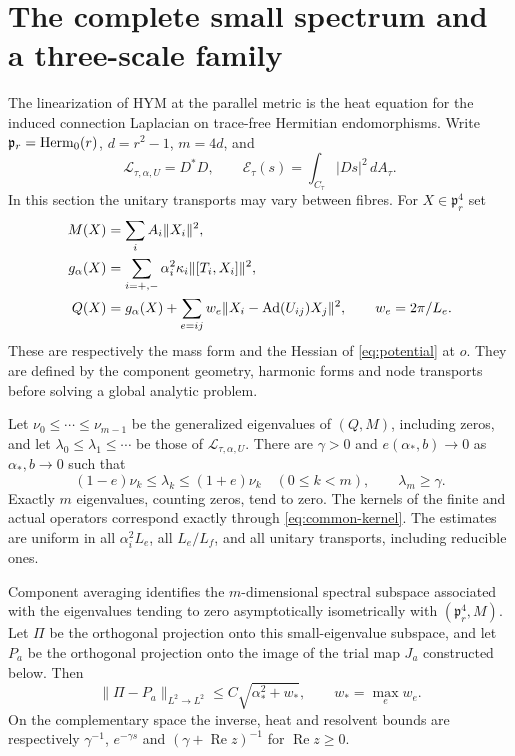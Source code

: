 \section{The complete small spectrum and a three-scale family}\label{sec:spectrum}

The linearization of HYM at the parallel metric is the heat
equation for the induced connection Laplacian on trace-free
Hermitian endomorphisms. Write $\mathfrak p_r=\operatorname{Herm}_0(r)$,
$d=r^2-1$, $m=4d$, and
\[
 \mathcal L_{\tau,\alpha,U}=D^*D,\qquad
 \mathcal E_\tau(s)=\int_{C_\tau}|Ds|^2\,dA_\tau .
\]
In this section the unitary transports may vary between fibres.
For $X\in\mathfrak p_r^4$ set
\begin{equation}\label{eq:effective-forms}
 \begin{split}
 M(X)&=\sum_i A_i\|X_i\|^2,\\
 g_\alpha(X)&=\sum_{i=+,-}\alpha_i^2\kappa_i\|[T_i,X_i]\|^2,\\
 Q(X)&=g_\alpha(X)+
       \sum_{e=ij}w_e\|X_i-\operatorname{Ad}(U_{ij})X_j\|^2,\qquad
 w_e=2\pi/L_e .
 \end{split}
\end{equation}
These are respectively the mass form and the Hessian of
\eqref{eq:potential} at $o$. They are defined by the component
geometry, harmonic forms and node transports before solving a
global analytic problem.

\begin{theorem}\label{thm:relative-spectrum}
Let $\nu_0\le\cdots\le\nu_{m-1}$ be the generalized eigenvalues
of $(Q,M)$, including zeros, and let
$\lambda_0\le\lambda_1\le\cdots$ be those of
$\mathcal L_{\tau,\alpha,U}$. There are $\gamma>0$ and
$e(\alpha_*,b)\to0$ as $\alpha_*,b\to0$ such that
\begin{equation}\label{eq:relative-spectrum}
 (1-e)\nu_k\le\lambda_k\le(1+e)\nu_k\quad(0\le k<m),
 \qquad \lambda_m\ge\gamma.
\end{equation}
Exactly $m$ eigenvalues, counting zeros, tend to zero. The kernels
of the finite and actual operators correspond exactly through
\eqref{eq:common-kernel}. The estimates are uniform in all
$\alpha_i^2L_e$, all $L_e/L_f$, and all unitary transports,
including reducible ones.

Component averaging identifies the $m$-dimensional spectral
subspace associated with the eigenvalues tending to zero
asymptotically isometrically with $(\mathfrak p_r^4,M)$.
Let $\Pi$ be the orthogonal projection onto this small-eigenvalue
subspace, and let $P_a$ be the orthogonal projection onto the
image of the trial map $J_a$ constructed below. Then
\begin{equation}\label{eq:projection-comparison}
 \|\Pi-P_a\|_{L^2\to L^2}
                \le C\sqrt{\alpha_*^2+w_*},\qquad
 w_*=\max_e w_e.
\end{equation}
On the complementary space the inverse, heat and resolvent
bounds are respectively $\gamma^{-1}$, $e^{-\gamma s}$
and $(\gamma+\operatorname{Re}z)^{-1}$ for
$\operatorname{Re}z\ge0$.
\end{theorem}

